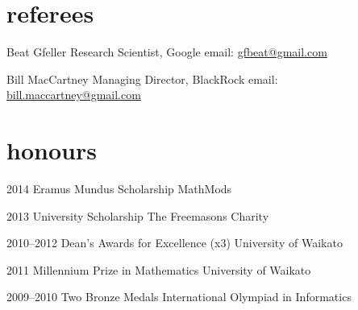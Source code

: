 \documentclass[]{boris-cv}
\begin{document}

\section{referees}

  {Beat Gfeller}
  {Research Scientist, Google}
  {email: \href{mailto:gfbeat@gmail.com}{gfbeat@gmail.com}}

  {Bill MacCartney}
  {Managing Director, BlackRock}
  {email: \href{mailto:bill.maccartney@gmail.com}{bill.maccartney@gmail.com}}


% 


\section{honours}
\begin{entrylist}
  \titleentry
    {2014}
    {Eramus Mundus Scholarship}
    {MathMods}

  \titleentry
    {2013}
    {University Scholarship}
    {The Freemasons Charity}

  \titleentry
    {2010--2012}
    {Dean's Awards for Excellence (x3)}
    {University of Waikato}

  \titleentry
    {2011}
    {Millennium Prize in Mathematics}
    {University of Waikato}


  \titleentry
    {2009--2010}
    {Two Bronze Medals}
    {International Olympiad in Informatics}

\end{entrylist}
\end{document}

